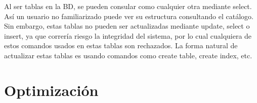 \documentclass[a4paper]{article}
\begin{document}
Al ser tablas en la BD, se pueden consular como cualquier otra mediante select.
As\'i un usuario no familiarizado puede ver su estructura consultando el
cat\'alogo. Sin embargo, estas tablas no pueden ser actualizadas mediante
update, select o insert, ya que correr\'ia riesgo la integridad del sistema,
por lo cual cualquiera de estos comandos usados en estas tablas son rechazados.
La forma natural de actualizar estas tablas es usando comandos como create
table, create index, etc.






\section{Optimizaci\'on}
\end{document}
